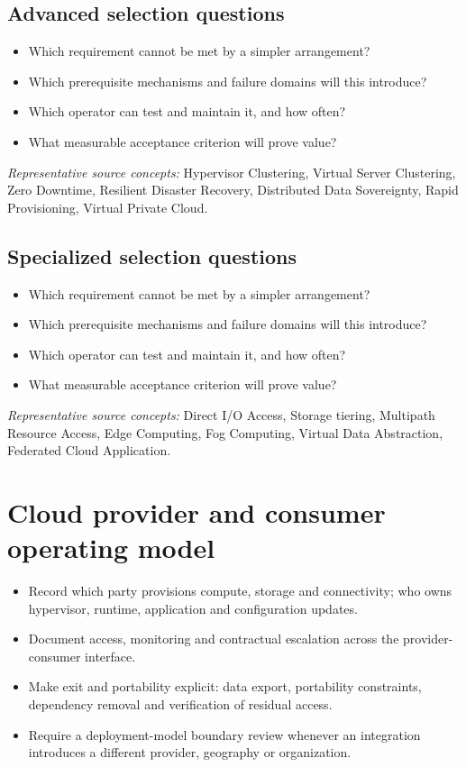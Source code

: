 \documentclass[10pt,letterpaper]{article}
\begin{document}
\subsection{Advanced selection questions}
\begin{itemize}
\item Which requirement cannot be met by a simpler arrangement?
\item Which prerequisite mechanisms and failure domains will this introduce?
\item Which operator can test and maintain it, and how often?
\item What measurable acceptance criterion will prove value?
\end{itemize}
\emph{Representative source concepts:} Hypervisor Clustering, Virtual Server Clustering, Zero Downtime, Resilient Disaster Recovery, Distributed Data Sovereignty, Rapid Provisioning, Virtual Private Cloud.\\
\subsection{Specialized selection questions}
\begin{itemize}
\item Which requirement cannot be met by a simpler arrangement?
\item Which prerequisite mechanisms and failure domains will this introduce?
\item Which operator can test and maintain it, and how often?
\item What measurable acceptance criterion will prove value?
\end{itemize}
\emph{Representative source concepts:} Direct I/O Access, Storage tiering, Multipath Resource Access, Edge Computing, Fog Computing, Virtual Data Abstraction, Federated Cloud Application.\\
\section{Cloud provider and consumer operating model}
\begin{itemize}
\item Record which party provisions compute, storage and connectivity; who owns hypervisor, runtime, application and configuration updates.
\item Document access, monitoring and contractual escalation across the provider-consumer interface.
\item Make exit and portability explicit: data export, portability constraints, dependency removal and verification of residual access.
\item Require a deployment-model boundary review whenever an integration introduces a different provider, geography or organization.
\end{itemize}
\end{document}
